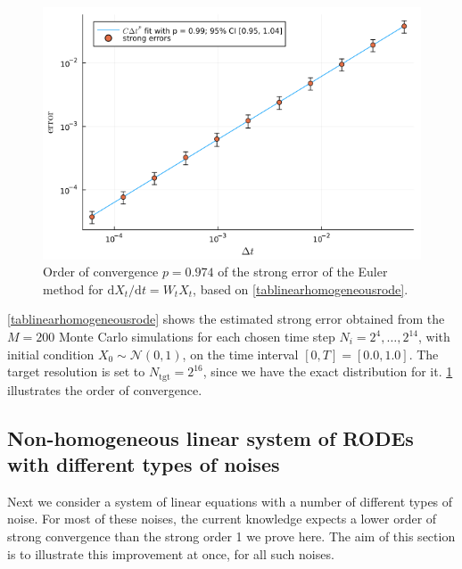 \documentclass[reqno,12pt]{amsart}
\theoremstyle{plain} %
\theoremstyle{definition} %
\begin{document}
\begin{figure}[htb]
    \includegraphics[scale=0.6]{img/order_wiener_linearhomogenous.png}
    \caption{Order of convergence $p = 0.974$ of the strong error of the Euler method for $\mathrm{d}X_t/\mathrm{d}t = W_t X_t$, based on \cref{tablinearhomogeneousrode}.}
    \label{figlinearhomogeneousrode}
\end{figure}

\cref{tablinearhomogeneousrode} shows the estimated strong error obtained from the $M = 200$ Monte Carlo simulations for each chosen time step $N_i = 2^4, \ldots, 2^{14}$, with initial condition $X_0 \sim \mathcal{N}(0, 1)$, on the time interval $[0, T] = [0.0, 1.0]$. The target resolution is set to $N_{\textrm{tgt}} = 2^{16}$, since we have the exact distribution for it. \cref{figlinearhomogeneousrode} illustrates the order of convergence.

\subsection{Non-homogeneous linear system of RODEs with different types of noises}

Next we consider a system of linear equations with a number of different types of noise. For most of these noises, the current knowledge expects a lower order of strong convergence than the strong order 1 we prove here. The aim of this section is to illustrate this improvement at once, for all such noises.
\end{document}
